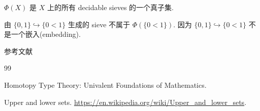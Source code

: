 \documentclass{beamer}
\begin{document}
\begin{frame}
$\Phi(X)$ 是 $X$ 上的所有 decidable sieves 的一个真子集.

\vspace{5mm}
由 $\{0,1\} \hookrightarrow \{0 < 1\}$ 生成的 sieve 不属于 $\Phi(\{0 < 1\})$. 因为 $\{0,1\}\hookrightarrow\{0 < 1\}$ 不是一个嵌入(embedding). 
\end{frame}

\begin{frame}[allowframebreaks]{参考文献}
\begin{thebibliography}{99}

Homotopy Type Theory: Univalent Foundations of Mathematics.

Upper and lower sets. \url{https://en.wikipedia.org/wiki/Upper_and_lower_sets}.

\end{thebibliography}
\end{frame}
\end{document}
